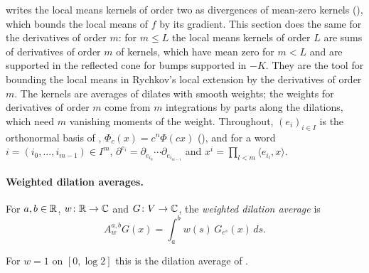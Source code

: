  writes the local means kernels of order two as divergences
of mean-zero kernels (), which bounds the local means of $f$ by its
gradient. This section does the same
for the derivatives of order $m$: for $m \leq L$ the local means kernels of order $L$ are sums of
derivatives of order $m$ of kernels, which have mean zero for $m < L$ and are supported in the
reflected cone for bumps supported in $-K$. They are the tool for bounding the local means in
Rychkov's local extension \cite{Rychkov} by the derivatives of order $m$. The kernels are averages
of
dilates with smooth weights; the weights for derivatives of order $m$ come from $m$ integrations
by parts along the dilations, which need $m$ vanishing moments of the weight. Throughout,
$(e_i)_{i \in I}$ is the orthonormal basis of ,
$\Phi_c(x) = c^n \Phi(c x)$ (), and for a word $i = (i_0, \dots, i_{m-1}) \in I^m$,
$\partial^{e_i} = \partial_{e_{i_0}} \cdots \partial_{e_{i_{m-1}}}$ and
$x^i = \prod_{l < m} \langle e_{i_l}, x \rangle$.

\paragraph{Weighted dilation averages.}

\begin{definition}
\label{def:weighted-dilation}
\leanok
{}
For $a, b \in \mathbb{R}$, $w \colon \mathbb{R} \to \mathbb{C}$ and $G \colon V \to \mathbb{C}$, the \emph{weighted dilation
average} is
\[
  A^{a,b}_w G(x) = \int_a^b w(s) \, G_{e^s}(x) \, ds .
\]
\end{definition}

For $w = 1$ on $[0, \log 2]$ this is the dilation average of .

